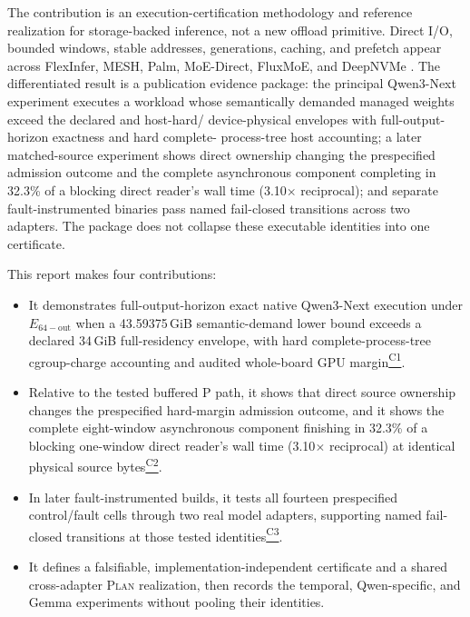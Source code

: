 \documentclass[letterpaper,twocolumn,10pt]{article}
\newcommand{\Plan}{\textsc{Plan}\xspace}
\newcommand{\GiB}{\,GiB\xspace}
\newcommand{\claimref}[1]{\hyperlink{claim:#1}{\textsuperscript{\textsf{#1}}}}
\begin{document}
The contribution is an execution-certification methodology and reference
realization for storage-backed inference, not a new offload primitive.  Direct I/O, bounded
windows, stable addresses, generations, caching, and prefetch appear across
FlexInfer, MESH, Palm, MoE-Direct, FluxMoE, and DeepNVMe
\cite{flexinfer,mesh,palm,moedirect,fluxmoe,deepnvme}.  The differentiated result
is a publication evidence package: the principal Qwen3-Next experiment executes a workload
whose semantically demanded managed weights exceed the declared and host-hard/
device-physical envelopes with full-output-horizon exactness and hard complete-
process-tree host accounting; a later matched-source experiment shows direct ownership
changing the prespecified admission outcome and the complete asynchronous
component completing in 32.3\% of a blocking direct reader's wall time
(3.10$\times$ reciprocal); and separate fault-instrumented binaries pass named
fail-closed transitions across two adapters.  The package does not collapse
these executable identities into one certificate.

This report makes four contributions:

\begin{itemize}
  \item It demonstrates full-output-horizon exact native Qwen3-Next execution
  under $E_{\mathrm{64-out}}$ when a 43.59375\GiB semantic-demand lower bound
  exceeds a declared 34\GiB full-residency envelope, with hard
  complete-process-tree cgroup-charge accounting and audited whole-board GPU
  margin\claimref{C1}.
  \item Relative to the tested buffered P path, it shows that direct source
  ownership changes the prespecified hard-margin admission outcome, and it
  shows the complete eight-window asynchronous component finishing in 32.3\% of
  a blocking one-window direct reader's wall time (3.10$\times$ reciprocal) at
  identical physical source bytes\claimref{C2}.
  \item In later fault-instrumented builds, it tests all fourteen prespecified control/fault
  cells through two real model adapters, supporting named fail-closed
  transitions at those tested identities\claimref{C3}.
  \item It defines a falsifiable, implementation-independent certificate and a
  shared cross-adapter \Plan realization, then records the temporal,
  Qwen-specific, and Gemma experiments without pooling their identities.
\end{itemize}
\end{document}
